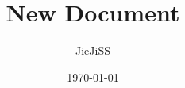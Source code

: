 \documentclass[UTF8, a4paper, 12pt]{ctexart}
\title{New Document}
\author{JieJiSS}
\date{\today}
\begin{document}
  \maketitle
  \newpage
  \tableofcontents
  \newpage

  \setlength{\parskip}{1mm}
  \setlength{\parindent}{2em}
  \begin{spacing}{1.4}
  
  
  \end{spacing}
\end{document}
